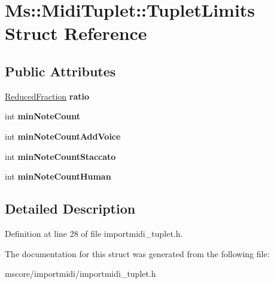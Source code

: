 \hypertarget{struct_ms_1_1_midi_tuplet_1_1_tuplet_limits}{}\section{Ms\+:\+:Midi\+Tuplet\+:\+:Tuplet\+Limits Struct Reference}
\label{struct_ms_1_1_midi_tuplet_1_1_tuplet_limits}
\subsection*{Public Attributes}
\begin{DoxyCompactItemize}
\item 
\mbox{\label{struct_ms_1_1_midi_tuplet_1_1_tuplet_limits_a1283fd7745e9953ac037752fa899a5f9}} 
\hyperlink{class_ms_1_1_reduced_fraction}{Reduced\+Fraction} {\bfseries ratio}
\item 
\mbox{\label{struct_ms_1_1_midi_tuplet_1_1_tuplet_limits_af0ffa8935c5c27e21f6f0a5a20dda2ed}} 
int {\bfseries min\+Note\+Count}
\item 
\mbox{\label{struct_ms_1_1_midi_tuplet_1_1_tuplet_limits_a031cd65aa9b9c75bf6260cfb06b6539d}} 
int {\bfseries min\+Note\+Count\+Add\+Voice}
\item 
\mbox{\label{struct_ms_1_1_midi_tuplet_1_1_tuplet_limits_a55a7bdde2ccc9e105fc788d520936b5c}} 
int {\bfseries min\+Note\+Count\+Staccato}
\item 
\mbox{\label{struct_ms_1_1_midi_tuplet_1_1_tuplet_limits_aa33db6c0940f16f5618401f2ae6240b6}} 
int {\bfseries min\+Note\+Count\+Human}
\end{DoxyCompactItemize}


\subsection{Detailed Description}


Definition at line 28 of file importmidi\+\_\+tuplet.\+h.



The documentation for this struct was generated from the following file\+:\begin{DoxyCompactItemize}
\item 
mscore/importmidi/importmidi\+\_\+tuplet.\+h\end{DoxyCompactItemize}
